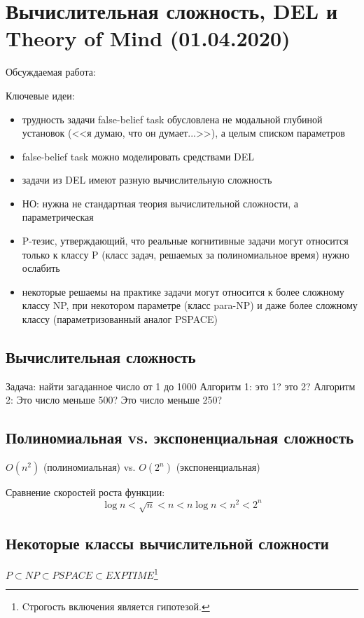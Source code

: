 \section{Вычислительная сложность, DEL и Theory of Mind (01.04.2020)}
Обсуждаемая работа: \autocite{VandePol2018}

Ключевые идеи:
\begin{itemize}
\item трудность задачи false-belief task обусловлена не модальной глубиной установок (<<я думаю, что он думает...>>), а целым списком параметров 
\item  false-belief task можно моделировать средствами DEL
\item  задачи из DEL имеют разную вычислительную сложность
\item НО: нужна не стандартная теория вычислительной сложности, а параметрическая
\item P-тезис, утверждающий, что реальные когнитивные задачи могут относится только к классу P (класс задач, решаемых за полиномиальное время) нужно ослабить
\item некоторые решаемы на практике задачи могут относится к более сложному классу NP, при некотором параметре (класс para-NP) и даже более сложному классу (параметризованный аналог PSPACE)
\end{itemize}

\subsection{Вычислительная сложность}
Задача: найти загаданное число от 1 до 1000
Алгоритм 1: это 1? это 2?
Алгоритм 2: Это число меньше 500? Это число меньше 250?

\subsection{Полиномиальная vs. экспоненциальная сложность}
$O(n^2)$ (полиномиальная) vs. $O(2^n)$ (экспоненциальная)

Сравнение скоростей роста функции:
\begin{equation}
    \log  n < \sqrt{n} < n < n  \log  n < n^2 < 2^n
\end{equation}


\subsection{Некоторые классы вычислительной сложности}

\begin{center}
$P \subset NP \subset PSPACE \subset EXPTIME$\footnote{
Cтрогость включения  является гипотезой.}	
\end{center}

